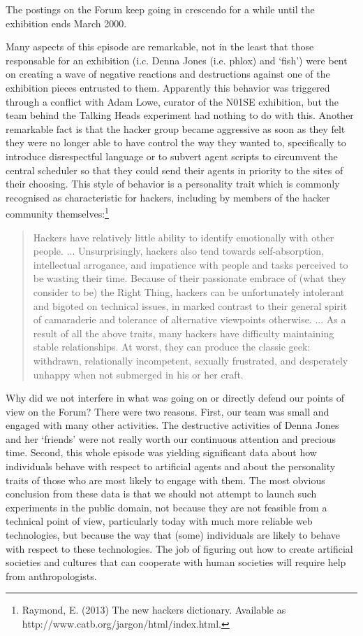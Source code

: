 The postings on the Forum keep going in crescendo for a while until the exhibition ends March 2000. 

Many aspects of this episode are remarkable, not in the least that those responsable for an 
exhibition (i.c. Denna Jones (i.e. phlox) and `fish') were bent on creating a wave of negative reactions and 
destructions against one of the exhibition pieces entrusted to them. Apparently this behavior was triggered through
a conflict 
with Adam Lowe, curator of the N01SE exhibition, but the team behind the Talking Heads experiment had nothing to do 
with this. Another remarkable fact is that the hacker group 
became aggressive as soon as they felt they were no longer able to have control the way they wanted to, specifically 
to introduce disrespectful language or to subvert agent scripts to circumvent the central scheduler so that they 
could send their agents in priority to the sites of their choosing.
This style of behavior is a personality trait which is commonly recognised as characteristic for 
hackers, including by members of the hacker community themselves:\footnote{
Raymond, E. (2013) The new hackers dictionary. Available as http://www.catb.org/jargon/html/index.html.}

\begin{quotation}
Hackers have relatively little ability to identify emotionally with other people. ... Unsurprisingly, hackers also tend towards self-absorption, intellectual arrogance, and impatience with people and tasks perceived to be wasting their time. Because of their passionate embrace of (what they consider to be) the Right Thing, hackers can be unfortunately intolerant and bigoted on technical issues, in marked contrast to their general spirit of camaraderie and tolerance of alternative viewpoints otherwise. ... As a result of all the above traits, many hackers have difficulty maintaining stable relationships. At worst, they can produce the classic geek: withdrawn, relationally incompetent, sexually frustrated, and desperately unhappy when not submerged in his or her craft.
\end{quotation}

Why did we not interfere in what was going on or directly defend our points of view on the Forum? There were two reasons. First, our team was small and engaged with many other activities. The destructive activities of Denna Jones and her `friends' were not really worth our continuous attention and precious time. Second, this whole episode was yielding significant data about how individuals behave with respect to artificial agents and about the personality traits of those who are most likely to engage with them. The most obvious conclusion from these data is that we should not attempt to launch such experiments in 
the public domain, not because they are not feasible from a technical point of view, particularly today with much more 
reliable web technologies, but because the way that (some) individuals are likely 
to behave with respect to these technologies. The job of figuring out how to create artificial societies and cultures 
that can cooperate with human societies will require help from anthropologists.\cite{Knight:1999}

